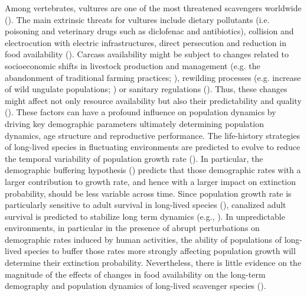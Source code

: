 \documentclass[12pt]{article}
\begin{document}
Among vertebrates, vultures are one of the most threatened scavengers worldwide (\cite{Buechley2016}). The main extrinsic threats for vultures include dietary pollutants (i.e. poisoning and veterinary drugs such as diclofenac and antibiotics), collision and electrocution with electric infrastructures, direct persecution and reduction in food availability (\cite{Ogada2012,Blanco2016,Buechley2016}). Carcass availability might be subject to changes related to socioeconomic shifts in livestock production and management (e.g. the abandonment of traditional farming practices; \cite{Olea2009}), rewilding processes (e.g. increase of wild ungulate populations; \cite{Cortes-Avizanda2015}) or sanitary regulations (\cite{Margalida2010,Blanco2014}). Thus, these changes might affect not only resource availability but also their predictability and quality (\cite{Donazar2009b,Cortes-Avizanda2012,Blanco2014,Blanco2017,Blanco2019}). These factors can have a profound influence on population dynamics by driving key demographic parameters ultimately determining population dynamics, age structure and reproductive performance. The life-history strategies of long-lived species in fluctuating environments are predicted to evolve to reduce the temporal variability of population growth rate (\cite{Roff2002,Doak2005}). In particular, the demographic buffering hypothesis (\cite{Pfister2002}) predicts that those demographic rates with a larger contribution to growth rate, and hence with a larger impact on extinction probability, should be less variable across time. Since population growth rate is particularly sensitive to adult survival in long-lived species (\cite{Saether2000,Gaillard2010}), canalized adult survival is predicted to stabilize long term dynamics (e.g., \cite{Rotella2019}). In unpredictable environments, in particular in the presence of abrupt perturbations on demographic rates induced by human activities, the ability of populations of long-lived species to buffer those rates more strongly affecting population growth will determine their extinction probability. Nevertheless, there is little evidence on the magnitude of the effects of changes in food availability on the long-term demography and population dynamics of long-lived scavenger species (\cite{Margalida2014b}). \\
\end{document}
